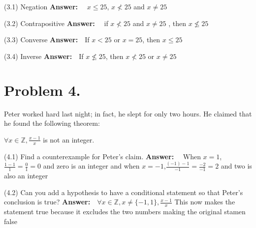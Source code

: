 \documentclass[11pt]{article}
\begin{document}
\noindent
(3.1) Negation
\newline
\newline
%
{\bf Answer:}~~ $x \leq 25$, $x \nless 25$ and $ x \neq 25$
\newline
\newline

\noindent
(3.2) Contrapositive
\newline
\newline
{\bf Answer:}~~ if $x \nless 25$ and $x \neq 25$ , then $x \nleq 25$
\newline
\newline

\noindent
(3.3) Converse
\newline
\newline
{\bf Answer:}~~If $x<25$ or $x=25$, then $x \leq 25$
\newline
\newline

\noindent
(3.4) Inverse
\newline
\newline
{\bf Answer:}~~If $x \nleq 25$, then $x \nless 25$ or $x \neq 25$
\newline
\newline
\newpage

\section*{Problem 4.}

Peter worked hard last night; in fact, he slept for only two hours. He claimed that he found the following theorem:

$\forall x\in\mathbb{Z}, \frac{x-1}{x}$ is not an integer.
\newline

\noindent
(4.1) Find a counterexample for Peter's claim.
\newline
\newline
{\bf Answer:}~~ When $x=1$, $\frac{1-1}{1}=\frac{0}{1}=0$ and zero is an integer and when $x=-1$,$\frac{(-1)-1}{-1}=\frac{-2}{-1}=2$ and two is also an integer
\newline
\newline

\noindent
(4.2) Can you add a hypothesis to have a conditional statement so that Peter's conclusion is true?
\newline
\newline
{\bf Answer:}~~$\forall x\in\mathbb{Z},x\neq \{-1,1\} , \frac{x-1}{x}$
\newline
This now makes the statement true because it excludes the two numbers making the original stamen false
\newline
\newline
\newpage
\end{document}
